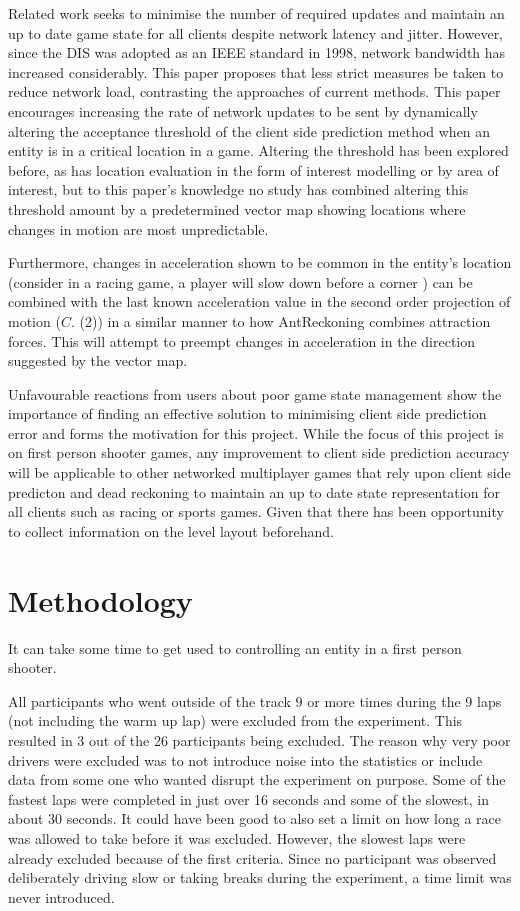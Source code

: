 \documentclass[journal]{IEEEtran}
\begin{document}
Related work seeks to minimise the number of required updates and maintain an up to date game state for all clients despite network latency and jitter. However, since the DIS was adopted as an IEEE standard in 1998, network bandwidth has increased considerably. This paper proposes that less strict measures be taken to reduce network load, contrasting the approaches of current methods. This paper encourages increasing the rate of network updates to be sent by dynamically altering the acceptance threshold of the client side prediction method when an entity is in a critical location in a game. Altering the threshold has been explored before, as has location evaluation in the form of interest modelling or by area of interest, but to this paper's knowledge no study has combined altering this threshold amount by a predetermined vector map showing locations where changes in motion are most unpredictable.

Furthermore, changes in acceleration shown to be common in the entity's location (consider in a racing game, a player will slow down before a corner \cite{larsson2016movement}) can be combined with the last known acceleration value in the second order projection of motion ($C.$ (2)) in a similar manner to how AntReckoning combines attraction forces. This will attempt to preempt changes in acceleration in the direction suggested by the vector map.

Unfavourable reactions from users about poor game state management show the importance of finding an effective solution to minimising client side prediction error and forms the motivation for this project. While the focus of this project is on first person shooter games, any improvement to client side prediction accuracy will be applicable to other networked multiplayer games that rely upon client side predicton and dead reckoning to maintain an up to date state representation for all clients such as racing or sports games. Given that there has been opportunity to collect information on the level layout beforehand.

\section{Methodology}

It can take some time to get used to controlling an entity in a first person shooter. 


All participants who went outside of the track 9 or more times during the 9 laps
(not including the warm up lap) were excluded from the experiment. This resulted
in 3 out of the 26 participants being excluded. The reason why very poor
drivers were excluded was to not introduce noise into the statistics or include
data from some one who wanted disrupt the experiment on purpose.
Some of the fastest laps were completed in just over 16 seconds and some of
the slowest, in about 30 seconds. It could have been good to also set a limit on
how long a race was allowed to take before it was excluded. However, the slowest
laps were already excluded because of the first criteria. Since no participant was
observed deliberately driving slow or taking breaks during the experiment, a time
limit was never introduced.
\end{document}
